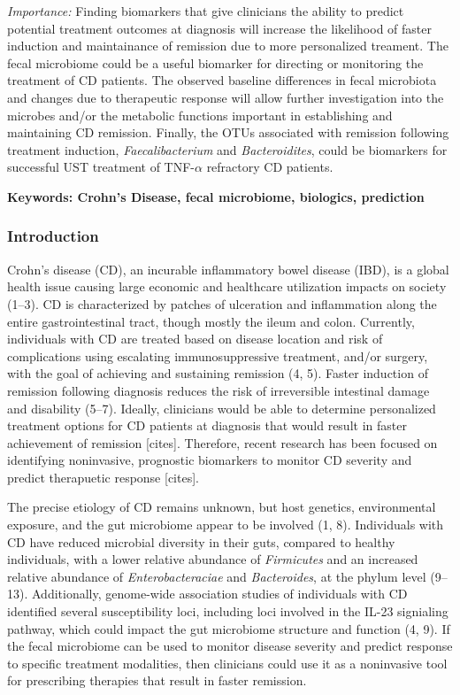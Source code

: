 \documentclass[11pt,]{article}
\begin{document}
\emph{Importance:} Finding biomarkers that give clinicians the ability
to predict potential treatment outcomes at diagnosis will increase the
likelihood of faster induction and maintainance of remission due to more
personalized treament. The fecal microbiome could be a useful biomarker
for directing or monitoring the treatment of CD patients. The observed
baseline differences in fecal microbiota and changes due to therapeutic
response will allow further investigation into the microbes and/or the
metabolic functions important in establishing and maintaining CD
remission. Finally, the OTUs associated with remission following
treatment induction, \emph{Faecalibacterium} and \emph{Bacteroidites},
could be biomarkers for successful UST treatment of TNF-\({\alpha}\)
refractory CD patients.

\textbf{Keywords: Crohn's Disease, fecal microbiome, biologics,
prediction}

\newpage

\subsubsection{Introduction}\label{introduction}

Crohn's disease (CD), an incurable inflammatory bowel disease (IBD), is
a global health issue causing large economic and healthcare utilization
impacts on society (1--3). CD is characterized by patches of ulceration
and inflammation along the entire gastrointestinal tract, though mostly
the ileum and colon. Currently, individuals with CD are treated based on
disease location and risk of complications using escalating
immunosuppressive treatment, and/or surgery, with the goal of achieving
and sustaining remission (4, 5). Faster induction of remission following
diagnosis reduces the risk of irreversible intestinal damage and
disability (5--7). Ideally, clinicians would be able to determine
personalized treatment options for CD patients at diagnosis that would
result in faster achievement of remission {[}cites{]}. Therefore, recent
research has been focused on identifying noninvasive, prognostic
biomarkers to monitor CD severity and predict therapuetic response
{[}cites{]}.

The precise etiology of CD remains unknown, but host genetics,
environmental exposure, and the gut microbiome appear to be involved (1,
8). Individuals with CD have reduced microbial diversity in their guts,
compared to healthy individuals, with a lower relative abundance of
\emph{Firmicutes} and an increased relative abundance of
\emph{Enterobacteraciae} and \emph{Bacteroides}, at the phylum level
(9--13). Additionally, genome-wide association studies of individuals
with CD identified several susceptibility loci, including loci involved
in the IL-23 signialing pathway, which could impact the gut microbiome
structure and function (4, 9). If the fecal microbiome can be used to
monitor disease severity and predict response to specific treatment
modalities, then clinicians could use it as a noninvasive tool for
prescribing therapies that result in faster remission.
\end{document}
